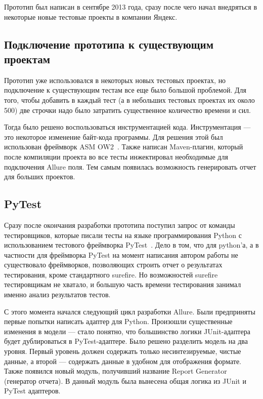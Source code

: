 Прототип был написан в сентябре 2013 года, сразу после чего начал внедряться в некоторые новые тестовые проекты в компании Яндекс.

\subsection{Подключение прототипа к существующим проектам}

Прототип уже использовался в некоторых новых тестовых проектах, но подключение к существующим тестам все еще было большой проблемой. Для того, чтобы добавить в каждый тест (а в небольших тестовых проектах их около 500) две строчки надо было затратить существенное количество времени и сил. 

Тогда было решено воспользоваться инструментацией кода. Инструментация --- это некоторое изменение байт-кода программы. Для решения этой был использован фреймворк ASM OW2~\cite{ow2_asm_home}. Также написан Maven-плагин, который после компиляции проекта во все тесты инжектировал необходимые для подключения Allure поля. Тем самым появилась возможность генерировать отчет для больших проектов.

\subsection{PyTest}

Сразу после окончания разработки прототипа поступил запрос от команды тестировщиков, которые писали тесты на языке программирования Python с использованием тестового фреймворка PyTest~\cite{pytest_home}. Дело в том, что для python'а, а в частности для фреймворка PyTest на момент написания автором работы не существовало фреймворков, позволяющих строить отчет о результатах тестирования, кроме стандартного surefire. Но возможностей surefire тестировщикам не хватало, и большую часть времени тестирования занимал именно анализ результатов тестов.

С этого момента начался следующий цикл разработки Allure. Были предприняты первые попытки написать адаптер для Python. Произошли существенные изменения в модели --- стало понятно, что большинство логики JUnit-адаптера будет дублироваться в PyTest-адаптере.
Было решено разделить модель на два уровня. Первый уровень должен содержать только несинтезируемые, чистые данные, а второй --- содержать данные в удобном для отображения формате. Также появился новый модуль, получивший название Report Generator (генератор отчета). В данный модуль была вынесена общая логика из JUnit и PyTest адаптеров.

